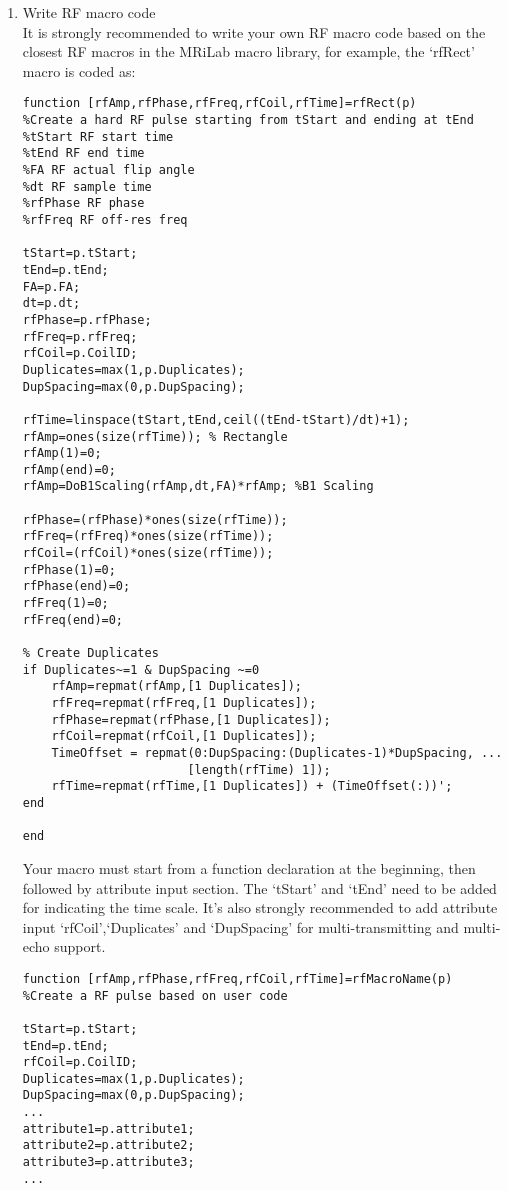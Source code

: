 \documentclass{book}%
\begin{document}
\begin{enumerate}

\item Write RF macro code \\

It is strongly recommended to write your own RF macro code based on the closest RF macros in the MRiLab macro library, for example, the `rfRect' macro is coded as:

\begin{verbatim}
function [rfAmp,rfPhase,rfFreq,rfCoil,rfTime]=rfRect(p)
%Create a hard RF pulse starting from tStart and ending at tEnd
%tStart RF start time
%tEnd RF end time
%FA RF actual flip angle
%dt RF sample time
%rfPhase RF phase
%rfFreq RF off-res freq

tStart=p.tStart;
tEnd=p.tEnd;
FA=p.FA;
dt=p.dt;
rfPhase=p.rfPhase;
rfFreq=p.rfFreq;
rfCoil=p.CoilID;
Duplicates=max(1,p.Duplicates);
DupSpacing=max(0,p.DupSpacing);

rfTime=linspace(tStart,tEnd,ceil((tEnd-tStart)/dt)+1);
rfAmp=ones(size(rfTime)); % Rectangle
rfAmp(1)=0;
rfAmp(end)=0;
rfAmp=DoB1Scaling(rfAmp,dt,FA)*rfAmp; %B1 Scaling

rfPhase=(rfPhase)*ones(size(rfTime));
rfFreq=(rfFreq)*ones(size(rfTime));
rfCoil=(rfCoil)*ones(size(rfTime));
rfPhase(1)=0;
rfPhase(end)=0;
rfFreq(1)=0;
rfFreq(end)=0;

% Create Duplicates
if Duplicates~=1 & DupSpacing ~=0
    rfAmp=repmat(rfAmp,[1 Duplicates]);
    rfFreq=repmat(rfFreq,[1 Duplicates]);
    rfPhase=repmat(rfPhase,[1 Duplicates]);
    rfCoil=repmat(rfCoil,[1 Duplicates]);
    TimeOffset = repmat(0:DupSpacing:(Duplicates-1)*DupSpacing, ...
                       [length(rfTime) 1]);
    rfTime=repmat(rfTime,[1 Duplicates]) + (TimeOffset(:))';
end

end
\end{verbatim}

Your macro must start from a function declaration at the beginning, then followed by attribute input section. The `tStart' and `tEnd' need to be added for indicating the time scale. It's also strongly recommended to add attribute input `rfCoil',`Duplicates' and `DupSpacing' for multi-transmitting and multi-echo support.

\begin{verbatim}
function [rfAmp,rfPhase,rfFreq,rfCoil,rfTime]=rfMacroName(p)
%Create a RF pulse based on user code

tStart=p.tStart;
tEnd=p.tEnd;
rfCoil=p.CoilID;
Duplicates=max(1,p.Duplicates);
DupSpacing=max(0,p.DupSpacing);
...
attribute1=p.attribute1;
attribute2=p.attribute2;
attribute3=p.attribute3;
...
\end{verbatim}


\end{enumerate}
\end{document}
